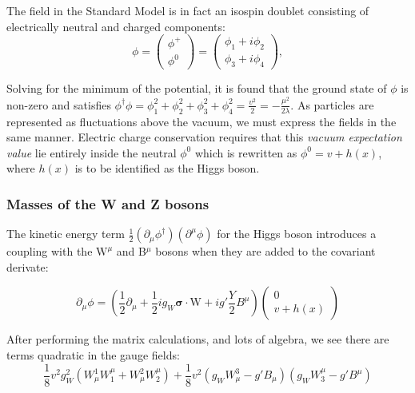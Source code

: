 The field in the Standard Model is in fact an isospin doublet consisting of electrically neutral and charged components:
\begin{equation}
\phi = \begin{pmatrix} \phi^{+} \\ \phi^{0} \end{pmatrix} = \begin{pmatrix} \phi_{1} + i\phi_{2} \\  \phi_{3} + i\phi_{4} \end{pmatrix},
\end{equation}

Solving for the minimum of the potential, it is found that the ground state of $\phi$ is non-zero and satisfies $\phi^{\dagger}\phi = \phi_{1}^{2} + \phi_{2}^{2} + \phi_{3}^{2}  + \phi_{4}^{2} = \frac{v^{2}}{2} = - \frac{\mu^{2}}{2\lambda}$. As particles are represented as fluctuations above the vacuum, we must express the fields in the same manner. Electric charge conservation requires that this \textit{vacuum expectation value} lie entirely inside the neutral $\phi^{0}$ which is rewritten as $\phi^{0} = v + h(x)$, where $h(x)$ is to be identified as the Higgs boson.

\subsubsection{Masses of the W and Z bosons}

The kinetic energy term $\frac{1}{2} (\partial_{\mu}\phi^{\dagger})(\partial^{\mu}\phi)$ for the Higgs boson introduces a coupling with the $\bm{\mathrm{W}}^{\mu}$ and B$^{\mu}$ bosons when they are added to the covariant derivate:

\begin{equation}
\partial_{\mu}\phi = (\frac{1}{2}\partial_{\mu} + \frac{1}{2} i g_{W}\bm{\sigma}\cdot\bm{\mathrm{W}} + i g' \frac{Y}{2} B^{\mu})\begin{pmatrix} 0 \\ v + h(x) \end{pmatrix}
\end{equation}

After performing the matrix calculations, and lots of algebra, we see there are terms quadratic in the gauge fields:
\begin{equation}
\frac{1}{8} v^{2} g_{W}^{2} ( W^{1}_{\mu} W_{1}^{\mu} + W^{2}_{\mu} W_{2}^{\mu}) + \frac{1}{8} v^{2} ( g_{W} W^{3}_{\mu} - g'B_{\mu} ) ( g_{W} W_{3}^{\mu} -g' B^{\mu} )
\end{equation}

